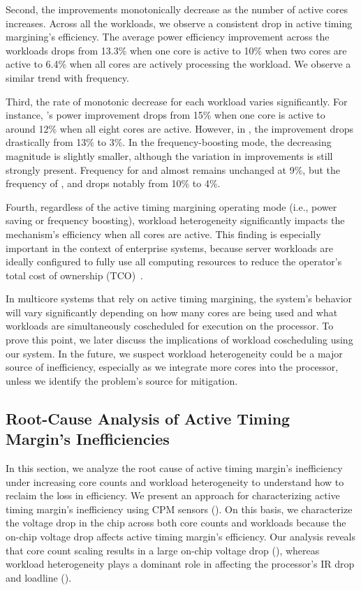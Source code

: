 Second, the improvements monotonically decrease as the number of active cores increases. Across all the workloads, we observe a consistent drop in active timing margining's efficiency. The average power efficiency improvement across the workloads drops from 13.3\% when one core is active to 10\% when two cores are active to 6.4\% when all cores are actively processing the workload. We observe a similar trend with frequency.

Third, the rate of monotonic decrease for each workload varies significantly. For instance, 's power improvement drops from 15\% when one core is active to around 12\% when all eight cores are active. However, in , the improvement drops drastically from 13\% to 3\%. In the frequency-boosting mode, the decreasing magnitude is slightly smaller, although the variation in improvements is still strongly present. Frequency for  and  almost remains unchanged at 9\%, but the frequency of ,  and  drops notably from 10\% to 4\%.

Fourth, regardless of the active timing margining operating mode (i.e., power saving or frequency boosting), workload heterogeneity significantly impacts the mechanism's efficiency when all cores are active. This finding is especially important in the context of enterprise systems, because server workloads are ideally configured to fully use all computing resources to reduce the operator's total cost of ownership (TCO)~\cite{barroso2007case}. 

In multicore systems that rely on active timing margining, the system's behavior will vary significantly depending on how many cores are being used and what workloads are simultaneously coscheduled for execution on the processor. To prove this point, we later discuss the implications of workload coscheduling using our system. In the future, we suspect workload heterogeneity could be a major source of inefficiency, especially as we integrate more cores into the processor, unless we identify the problem's source for mitigation.

\subsection{Root-Cause Analysis of Active Timing Margin's Inefficiencies}
\label{sec:ams:rootcause}

In this section, we analyze the root cause of active timing margin's inefficiency under increasing core counts and workload heterogeneity to understand how to reclaim the loss in efficiency. We present an approach for characterizing active timing margin's inefficiency using CPM sensors (). On this basis, we characterize the voltage drop in the chip across both core counts and workloads because the on-chip voltage drop affects active timing margin's efficiency. Our analysis reveals that core count scaling results in a large on-chip voltage drop (), whereas workload heterogeneity plays a dominant role in affecting the processor's IR drop and loadline ().

